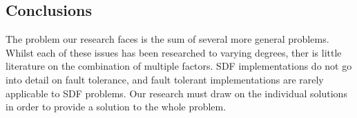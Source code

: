\subsection*{Conclusions}

The problem our research faces is the sum of several more general problems.
Whilst each of these issues has been researched to varying degrees, ther is little literature on the combination of multiple factors.
SDF implementations do not go into detail on fault tolerance, and fault tolerant implementations are rarely applicable to SDF problems.
Our research must draw on the individual solutions in order to provide a solution to the whole problem.






